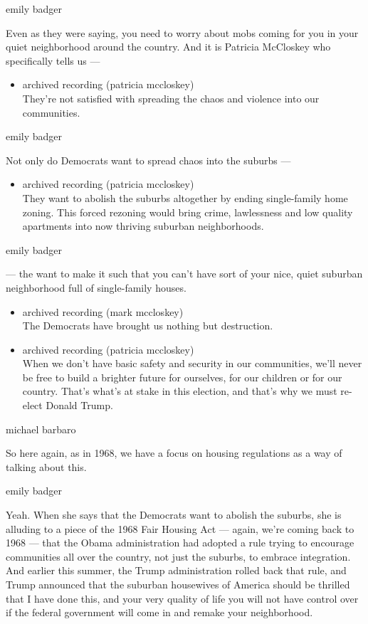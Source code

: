 emily badger

Even as they were saying, you need to worry about mobs coming for you in
your quiet neighborhood around the country. And it is Patricia McCloskey
who specifically tells us ---

\begin{itemize}
\tightlist
\item
  archived recording (patricia mccloskey)\\
  They're not satisfied with spreading the chaos and violence into our
  communities.
\end{itemize}

emily badger

Not only do Democrats want to spread chaos into the suburbs ---

\begin{itemize}
\tightlist
\item
  archived recording (patricia mccloskey)\\
  They want to abolish the suburbs altogether by ending single-family
  home zoning. This forced rezoning would bring crime, lawlessness and
  low quality apartments into now thriving suburban neighborhoods.
\end{itemize}

emily badger

--- the want to make it such that you can't have sort of your nice,
quiet suburban neighborhood full of single-family houses.

\begin{itemize}
\item
  archived recording (mark mccloskey)\\
  The Democrats have brought us nothing but destruction.
\item
  archived recording (patricia mccloskey)\\
  When we don't have basic safety and security in our communities, we'll
  never be free to build a brighter future for ourselves, for our
  children or for our country. That's what's at stake in this election,
  and that's why we must re-elect Donald Trump.
\end{itemize}

michael barbaro

So here again, as in 1968, we have a focus on housing regulations as a
way of talking about this.

emily badger

Yeah. When she says that the Democrats want to abolish the suburbs, she
is alluding to a piece of the 1968 Fair Housing Act --- again, we're
coming back to 1968 --- that the Obama administration had adopted a rule
trying to encourage communities all over the country, not just the
suburbs, to embrace integration. And earlier this summer, the Trump
administration rolled back that rule, and Trump announced that the
suburban housewives of America should be thrilled that I have done this,
and your very quality of life you will not have control over if the
federal government will come in and remake your neighborhood.

